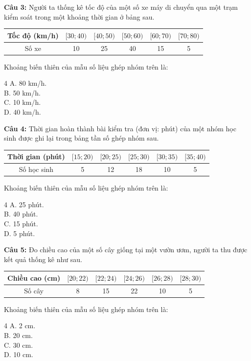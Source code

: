 \documentclass[12pt]{article}
\begin{document}
	\noindent \textbf{Câu 3:} Người ta thống kê tốc độ của một số xe máy di chuyển qua một trạm kiểm soát trong một khoảng thời gian ở bảng sau.
	\begin{center}
		\renewcommand{\arraystretch}{1.3}
		\begin{tabular}{|c|c|c|c|c|c|}
			\hline
			Tốc độ (km/h) & $[30; 40)$ & $[40; 50)$ & $[50; 60)$ & $[60; 70)$ & $[70; 80)$ \\
			\hline
			Số xe & 10 & 25 & 40 & 15 & 5 \\
			\hline
		\end{tabular}
	\end{center}
	Khoảng biến thiên của mẫu số liệu ghép nhóm trên là:
	\begin{multicols}{4}
		A. 80 km/h. \\
		B. 50 km/h. \\
		C. 10 km/h. \\
		D. 40 km/h.
	\end{multicols}
	
	\noindent \textbf{Câu 4:} Thời gian hoàn thành bài kiểm tra (đơn vị: phút) của một nhóm học sinh được ghi lại trong bảng tần số ghép nhóm sau.
	\begin{center}
		\renewcommand{\arraystretch}{1.3}
		\begin{tabular}{|c|c|c|c|c|c|}
			\hline
			Thời gian (phút) & $[15; 20)$ & $[20; 25)$ & $[25; 30)$ & $[30; 35)$ & $[35; 40)$ \\
			\hline
			Số học sinh & 5 & 12 & 18 & 10 & 5 \\
			\hline
		\end{tabular}
	\end{center}
	Khoảng biến thiên của mẫu số liệu ghép nhóm trên là:
	\begin{multicols}{4}
		A. 25 phút. \\
		B. 40 phút. \\
		C. 15 phút. \\
		D. 5 phút.
	\end{multicols}
	
	\noindent \textbf{Câu 5:} Đo chiều cao của một số cây giống tại một vườn ươm, người ta thu được kết quả thống kê như sau.
	\begin{center}
		\renewcommand{\arraystretch}{1.3}
		\begin{tabular}{|c|c|c|c|c|c|}
			\hline
			Chiều cao (cm) & $[20; 22)$ & $[22; 24)$ & $[24; 26)$ & $[26; 28)$ & $[28; 30)$ \\
			\hline
			Số cây & 8 & 15 & 22 & 10 & 5 \\
			\hline
		\end{tabular}
	\end{center}
	Khoảng biến thiên của mẫu số liệu ghép nhóm trên là:
	\begin{multicols}{4}
		A. 2 cm. \\
		B. 20 cm. \\
		C. 30 cm. \\
		D. 10 cm.
	\end{multicols}
	
\end{document}

